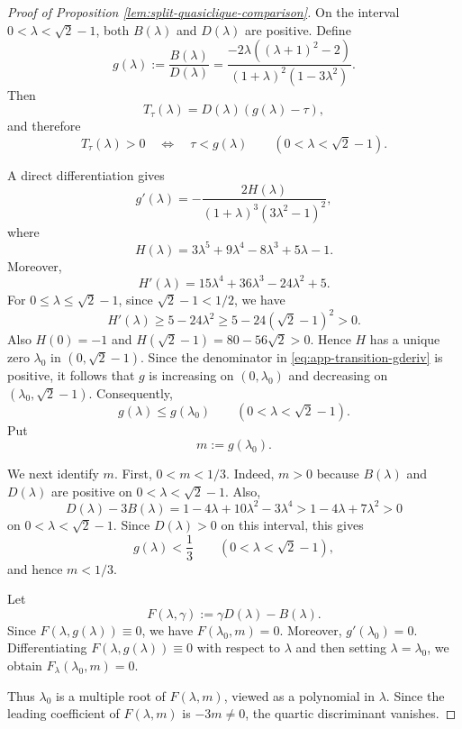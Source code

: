 \documentclass[10pt,a4paper]{amsart}
\begin{document}
\begin{proof}[Proof of Proposition \ref{lem:split-quasiclique-comparison}]
On the interval \(0<\lambda<\sqrt{2}-1\), both \(B(\lambda)\) and
\(D(\lambda)\) are positive. Define
\begin{equation}\label{eq:app-transition-gdef}
g(\lambda):=\frac{B(\lambda)}{D(\lambda)}
=
\frac{-2\lambda((\lambda+1)^2-2)}
{(1+\lambda)^2(1-3\lambda^2)}.
\end{equation}
Then
\[
T_\tau(\lambda)=D(\lambda)(g(\lambda)-\tau),
\]
and therefore
\begin{equation}\label{eq:app-transition-Tsign}
T_\tau(\lambda)>0
\quad\Longleftrightarrow\quad
\tau<g(\lambda)
\qquad
(0<\lambda<\sqrt{2}-1).
\end{equation}


A direct differentiation gives
\begin{equation}\label{eq:app-transition-gderiv}
g'(\lambda)
=
-\frac{2H(\lambda)}
{(1+\lambda)^3(3\lambda^2-1)^2},
\end{equation}
where
\[
H(\lambda)=3\lambda^5+9\lambda^4-8\lambda^3+5\lambda-1.
\]
Moreover,
\[
H'(\lambda)=15\lambda^4+36\lambda^3-24\lambda^2+5.
\]
For \(0\le\lambda\le\sqrt{2}-1\), since \(\sqrt{2}-1<1/2\), we have
\[
H'(\lambda)\ge 5-24\lambda^2
\ge 5-24(\sqrt{2}-1)^2>0.
\]
Also
$H(0)=-1$ and
$H(\sqrt{2}-1)=80-56\sqrt{2}>0.$ 
Hence \(H\) has a unique zero \(\lambda_0\) in
\((0,\sqrt{2}-1)\). Since the denominator in
\eqref{eq:app-transition-gderiv} is positive, it follows that \(g\) is
increasing on \((0,\lambda_0)\) and decreasing on
\((\lambda_0,\sqrt{2}-1)\). Consequently,
\begin{equation}\label{eq:app-transition-gmax}
g(\lambda)\le g(\lambda_0)
\qquad
(0<\lambda<\sqrt{2}-1).
\end{equation}
Put
\[
m:=g(\lambda_0).
\]


We next identify \(m\). First, \(0<m<1/3\). Indeed, \(m>0\) because
\(B(\lambda)\) and \(D(\lambda)\) are positive on
\(0<\lambda<\sqrt{2}-1\). Also,
\[
D(\lambda)-3B(\lambda)
=
1-4\lambda+10\lambda^2-3\lambda^4
>
1-4\lambda+7\lambda^2>0
\]
on \(0<\lambda<\sqrt{2}-1\). Since \(D(\lambda)>0\) on this interval, this
gives
\[
g(\lambda)<\frac13
\qquad
(0<\lambda<\sqrt{2}-1),
\]
and hence \(m<1/3\).


Let
\[
F(\lambda,\gamma):=\gamma D(\lambda)-B(\lambda).
\]
Since \(F(\lambda,g(\lambda))\equiv0\), we have
$F(\lambda_0,m)=0$. 
Moreover, \(g'(\lambda_0)=0\). Differentiating
\(F(\lambda,g(\lambda))\equiv0\) with respect to \(\lambda\) and then
setting \(\lambda=\lambda_0\), we obtain
$F_\lambda(\lambda_0,m)=0$.

Thus \(\lambda_0\) is a multiple root of \(F(\lambda,m)\), viewed as a
polynomial in \(\lambda\). Since the leading coefficient of \(F(\lambda,m)\)
is \(-3m\ne0\), the quartic discriminant vanishes.



\end{proof}
\end{document}
